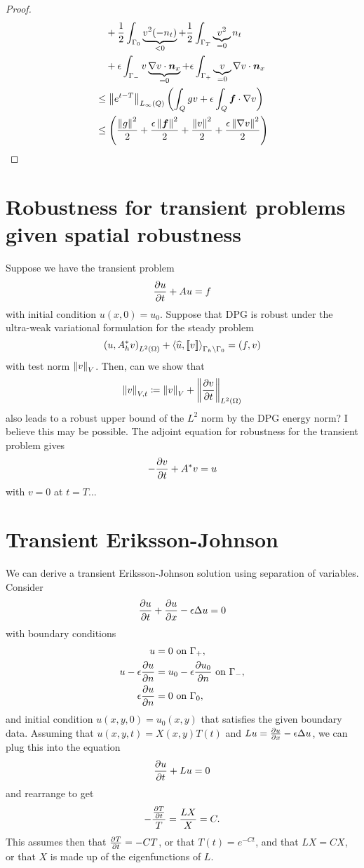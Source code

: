 \documentclass{article}
\begin{document}
\begin{proof}
\begin{align*}
&\quad+\frac{1}{2}\int_{\Gamma_0} \underbrace{v^2 (-n_t)}_{<0}
+\frac{1}{2}\int_{\Gamma_T} \underbrace{v^2}_{=0} n_t\\
&\quad+\epsilon\int_{\Gamma_-} v\underbrace{\nabla v\cdot\boldsymbol n_x}_{=0}
+\epsilon\int_{\Gamma_+} \underbrace{v}_{=0}\nabla v\cdot\boldsymbol n_x
\\
&\leq \left\| e^{t-T} \right\|_{L_\infty(Q)}\left( \int_Qgv+\epsilon\int_Q\boldsymbol f\cdot\nabla v \right)
\\
&\leq \left( \frac{\left\| g \right\|^2}{2}+\frac{\epsilon\left\| \boldsymbol f \right\|^2}{2}+\frac{\left\| v \right\|^2}{2}+\frac{\epsilon\left\| \nabla v \right\|^2}{2} \right)
\\
\end{align*}
\end{proof}


\section{Robustness for transient problems given spatial robustness}

Suppose we have the transient problem
\[
\frac{\partial u}{\partial t} + Au = f
\]
with initial condition $u(x,0) = u_0$.  Suppose that DPG is robust under the ultra-weak variational formulation for the steady problem
\[
\left( u,A^*_h v \right)_{L^2\left( \Omega \right)} + \left\langle \widehat{u}, \left[ \![v]\! \right] \right\rangle_{\Gamma_h\setminus \Gamma_0} = \left( f,v \right)
\]
with test norm $\left\| v \right\|_{V}$.  Then, can we show that 
\[
\left\| v \right\|_{V,t} \coloneqq \left\| v \right\|_V + \left\| \frac{\partial v}{\partial t} \right\|_{L^2\left( \Omega \right)}
\]
also leads to a robust upper bound of the $L^2$ norm by the DPG energy norm?  I believe this may be possible.  The adjoint equation for robustness for the transient problem gives
\[
-\frac{\partial v}{\partial t} + A^*v = u
\]
with $v = 0$ at $t=T$...  

\section{Transient Eriksson-Johnson}

We can derive a transient Eriksson-Johnson solution using separation of variables.  Consider
\[
\frac{\partial u}{\partial t} + \frac{\partial u}{\partial x} - \epsilon \Delta u = 0
\]
with boundary conditions
\begin{align*}
u &= 0 \text{ on } \Gamma_+,\\
u - \epsilon\frac{\partial u}{\partial n} &= u_0 - \epsilon\frac{\partial u_0}{\partial n} \text{ on }\Gamma_-,\\
\epsilon\frac{\partial u}{\partial n} &= 0 \text{ on } \Gamma_0,
\end{align*}
and initial condition $u(x,y,0) = u_0(x,y)$ that satisfies the given boundary data.  Assuming that $u(x,y,t) = X(x,y)T(t)$ and $Lu = \frac{\partial u}{\partial x} - \epsilon \Delta u$, we can plug this into the equation 
\[
\frac{\partial u}{\partial t} + Lu = 0
\]
and rearrange to get 
\[
-\frac{\frac{\partial T}{\partial t}}{T} = \frac{LX}{X} = C.
\]
This assumes then that $\frac{\partial T}{\partial t} = -CT$, or that $T(t) = e^{-Ct}$, and that $LX = CX$, or that $X$ is made up of the eigenfunctions of $L$.  
\end{document}
